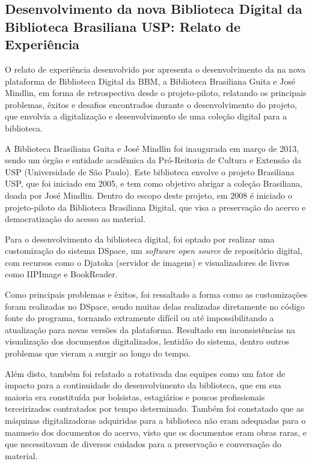 \subsection{Desenvolvimento da nova Biblioteca Digital da Biblioteca Brasiliana USP: Relato de Experiência}

O relato de experiência desenvolvido por \cite{2019:RodrigoMoreira}
apresenta o desenvolvimento da na nova plataforma de Biblioteca Digital da
BBM, a Biblioteca Brasiliana Guita e José Mindlin, em forma de retrospectiva
desde o projeto-piloto, relatando os principais problemas, êxitos
e desafios encontrados durante o desenvolvimento do projeto, que envolvia
a digitalização e desenvolvimento de uma coleção digital para a biblioteca.

A Biblioteca Brasiliana Guita e José Mindlin foi inaugurada em março
de 2013, sendo um órgão e entidade acadêmica da Pró-Reitoria de Cultura
e Extensão da USP (Universidade de São Paulo). Este biblioteca envolve o
projeto Brasiliana USP, que foi iniciado em 2005, e tem como objetivo
abrigar a coleção Brasiliana, doada por José Mindlin. Dentro do escopo
deste projeto, em 2008 é iniciado o projeto-piloto da Biblioteca
Brasiliana Digital, que visa a preservação do acervo e democratização
do acesso ao material.

Para o desenvolvimento da biblioteca digital, foi optado por realizar uma
customização do sistema DSpace, um \emph{software open source} de repositório
digital, com recursos como o Djatoka (servidor de imagens) e visualizadores
de livros como IIPImage e BookReader.

Como principais problemas e êxitos, foi ressaltado a forma como as customizações
foram realizadas no DSpace, sendo muitas delas realizadas diretamente no código fonte
do programa, tornando extramente difícil ou até impossibilitando a atualização
para novas versões da plataforma. Resultado em inconsistências na
visualização dos documentos digitalizados, lentidão do sistema, dentro outros
problemas que vieram a surgir ao longo do tempo.

Além disto, também foi relatado a rotativada das equipes como um fator de impacto
para a continuidade do desenvolvimento da biblioteca, que em sua
maioria era constituída por bolsistas, estagiários e poucos profissionais
terceirizados contratados por tempo determinado. Também foi constatado
que as máquinas digitalizadoras adquiridas para a biblioteca não eram
adequadas para o manuseio dos documentos do acervo, visto que os documentos
eram obras raras, e que necessitavam de diversos cuidados para a preservação
e conversação do material.

